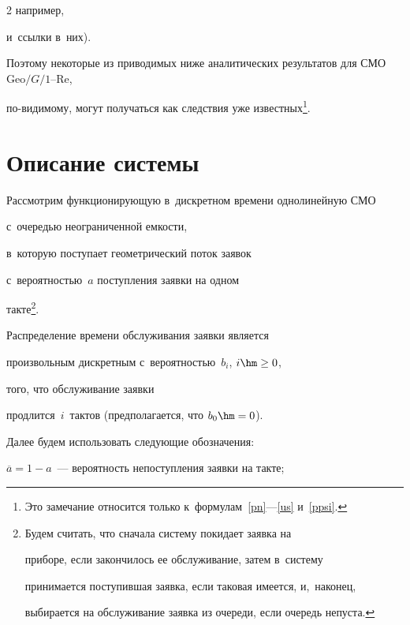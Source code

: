 \begin{multicols}{2}
например,~\cite{n0,n5,nm1,new1,wfb,new2,new3,new4,new5,stal,mey}

и~ссылки в~них).

Поэтому некоторые из приводимых ниже аналитических результатов для СМО $\mathrm{Geo}/G/1$--Re,

по-ви\-ди\-мо\-му, могут получаться как следствия уже известных\footnote[1]{Это замечание относится только к~формулам~\eqref{pn}---\eqref{us} и~\eqref{ppsi}.}.



\vspace*{-6pt}



\section{Описание системы}



\vspace*{-2pt}



Рассмотрим функционирующую в~дискретном времени однолинейную СМО

с~очередью неограниченной емкости,

в~которую поступает геометрический поток заявок

с~вероятностью~$a$ поступления заявки на одном 

такте\footnote[2]{Будем считать, что сначала систему покидает заявка на

приборе, если закончилось ее обслуживание, затем в~систему

принимается поступившая заявка, если таковая имеется, и,~наконец,

выбирается на обслуживание заявка из очереди, если очередь непуста.}.

Распределение времени обслуживания заявки является

произвольным дискретным с~вероятностью~$b_i$, $i \hm\ge 0$, 

того, что обслуживание заявки

продлится~$i$~тактов (предполагается, что $b_0\hm=0$).



Далее будем использовать следующие обозначения:

\begin{description}

\item $\overline{a}=1-a$~--- вероятность непоступления заявки на такте;


\end{description}
\end{multicols}

